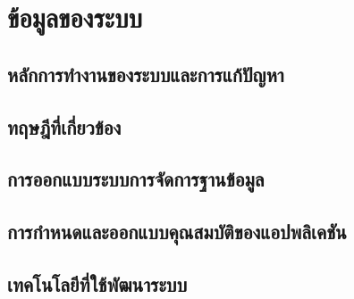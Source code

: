 \section{ข้อมูลของระบบ}

\subsection{หลักการทำงานของระบบและการแก้ปัญหา}

\subsection{ทฤษฎีที่เกี่ยวข้อง}

\subsection{การออกแบบระบบการจัดการฐานข้อมูล}

\subsection{การกำหนดและออกแบบคุณสมบัติของแอปพลิเคชัน}

\subsection{เทคโนโลยีที่ใช้พัฒนาระบบ}
